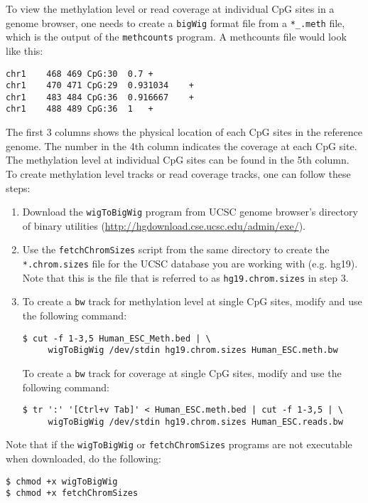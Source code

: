 \documentclass[10pt]{article}
\newcommand{\prog}[1]{\texttt{#1}}
\newcommand{\fn}[1]{\texttt{#1}}
\newcommand{\lit}[1]{\texttt{#1}}
\begin{document}
To view the methylation level or read coverage at individual CpG sites
in a genome browser, one needs to create a \lit{bigWig} format file
from a \fn{*\_.meth} file, which is the output of the \prog{methcounts}
program. A methcounts file would look like this:
\begin{verbatim}
chr1	468	469	CpG:30	0.7	+
chr1	470	471	CpG:29	0.931034	+
chr1	483	484	CpG:36	0.916667	+
chr1	488	489	CpG:36	1	+
\end{verbatim}
The first 3 columns shows the physical location of each CpG sites in
the reference genome. The number in the 4th column indicates the
coverage at each CpG site. The methylation level at individual CpG
sites can be found in the 5th column. To create methylation level
tracks or read coverage tracks, one can follow these steps:
\begin{enumerate}
\item Download the \prog{wigToBigWig} program from UCSC genome
  browser's directory of binary utilities
  (\url{http://hgdownload.cse.ucsc.edu/admin/exe/}).
\item Use the \fn{fetchChromSizes} script from the same directory to
  create the \fn{*.chrom.sizes} file for the UCSC database you are
  working with (e.g. hg19). Note that this is the file that is
  referred to as \fn{hg19.chrom.sizes} in step 3.
\item To create a \fn{bw} track for methylation level at single CpG
  sites, modify and use the following command:
\begin{verbatim}
$ cut -f 1-3,5 Human_ESC_Meth.bed | \
     wigToBigWig /dev/stdin hg19.chrom.sizes Human_ESC.meth.bw
\end{verbatim}
  To create a \fn{bw} track for coverage at single CpG sites, modify
  and use the following command:
\begin{verbatim}
$ tr ':' '[Ctrl+v Tab]' < Human_ESC.meth.bed | cut -f 1-3,5 | \
     wigToBigWig /dev/stdin hg19.chrom.sizes Human_ESC.reads.bw
\end{verbatim}
\end{enumerate}
Note that if the \prog{wigToBigWig} or \prog{fetchChromSizes} programs
are not executable when downloaded, do the following:
\begin{verbatim}
$ chmod +x wigToBigWig
$ chmod +x fetchChromSizes
\end{verbatim}
\end{document}

